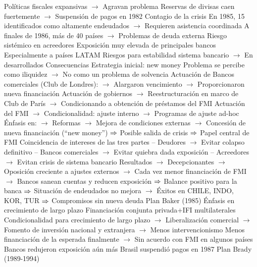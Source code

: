 \documentclass{nuevotema}
\begin{document}
\begin{esquemal}
				\4[] Políticas fiscales expansivas
				\4[] $\to$ Agravan problema
				\4[] Reservas de divisas caen fuertemente
				\4[] $\to$ Suspensión de pagos en 1982
				\4 Contagio de la crisis
				\4[] En 1985, 15 identificados como altamente endeudados
				\4[] $\to$ Requieren asistencia coordinada
				\4[] A finales de 1986, más de 40 países
				\4[] $\to$ Problemas de deuda externa
				\4 Riesgo sistémico en acreedores
				\4[] Exposición muy elevada de principales bancos
				\4[] Especialmente a países LATAM
				\4[] Riesgos para estabilidad sistema bancario
				\4[] $\to$ En desarrollados
			\3 Consecuencias
				\4 Estrategia inicial: new money
				\4[] Problema se percibe como iliquidez
				\4[] $\to$ No como un problema de solvencia
				\4[] Actuación de Bancos comerciales (Club de Londres):
				\4[] $\to$ Alargaron vencimiento
				\4[] $\to$ Proporcionaron nueva financiación
				\4[] Actuación de gobiernos
				\4[] $\to$ Reestructuración en marco de Club de París
				\4[] $\to$ Condicionando a obtención de préstamos del FMI
				\4[] Actuación del FMI
				\4[] $\to$ Condicionalidad: ajuste interno
				\4[] $\to$ Programas de ajuste ad-hoc
				\4[] Énfasis en:
				\4[] $\to$ Reformas
				\4[] $\to$ Mejora de condiciones externas
				\4[] $\to$ Concesión de nueva financiación (``new money'')
				\4[] $\Rightarrow$ Posible salida de crisis
				\4[] $\Rightarrow$ Papel central de FMI
				\4[] Coincidencia de intereses de las tres partes
				\4[] -- Deudores
				\4[] $\to$ Evitar colapso definitivo
				\4[] -- Bancos comerciales
				\4[] $\to$ Evitar quiebra dada exposición
				\4[] -- Acreedores
				\4[] $\to$ Evitan crisis de sistema bancario
				\4[] Resultados
				\4[] $\to$ Decepcionantes
				\4[] $\to$ Oposición creciente a ajustes externos
				\4[] $\to$ Cada vez menor financiación de FMI
				\4[] $\to$ Bancos sanean cuentas y reducen exposición
				\4[] $\Rightarrow$ Balance positivo para la banca
				\4[] $\Rightarrow$ Situación de endeudados no mejora
				\4[] $\to$ Éxitos en CHILE, INDO, KOR, TUR
				\4[] $\Rightarrow$ Compromisos sin nueva deuda
				\4 Plan Baker (1985)
				\4[] Énfasis en crecimiento de largo plazo
				\4[] Financiación conjunta privada+IFI multilaterales
				\4[] Condicionalidad para crecimiento de largo plazo
				\4[] $\to$ Liberalización comercial
				\4[] $\to$ Fomento de inversión nacional y extranjera
				\4[] $\to$ Menos intervencionismo
				\4[] Menos financiación de la esperada finalmente
				\4[] $\to$ Sin acuerdo con FMI en algunos países
				\4[] Bancos redujeron exposición aún más
				\4[] Brasil suspendió pagos en 1987
				\4 Plan Brady (1989-1994)

\end{esquemal}
\end{document}
